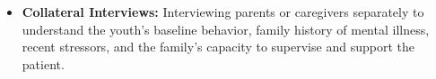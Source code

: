 \begin{itemize}
    \begin{itemize}
        \item targeted blood tests, including glucose, electrolytes, liver or kidney tests, when clinically indicated;
        \item toxicology or drug-specific tests when an overdose or intoxication is suspected; and
        \item pregnancy testing when relevant to the medical evaluation or treatment decisions.
    \end{itemize}
    \item \textbf{Collateral Interviews:} Interviewing parents or caregivers separately to understand the youth's baseline behavior, family history of mental illness, recent stressors, and the family's capacity to supervise and support the patient.
\end{itemize}

